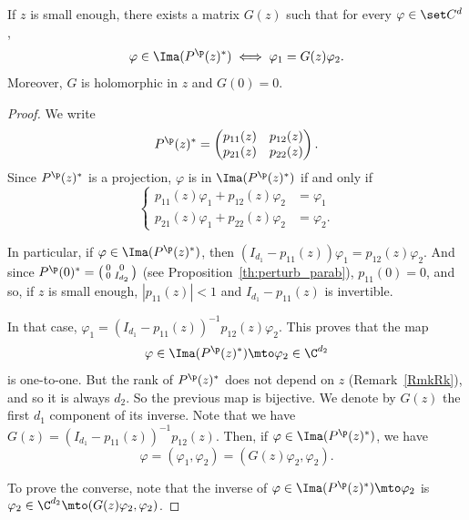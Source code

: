 \begin{prop}
\label{Prop:DefG}
If $z$ is small enough, there exists a matrix $G(z)$ such that for every $\varphi\in\set C^d$,
\[
\varphi\in\Ima(P^\p(z)^\ast) \iff \varphi_1 = G(z)\varphi_2.
\]
Moreover, $G$ is holomorphic in $z$ and $G(0) = 0$.
\end{prop}
\begin{proof}
We write
\[
P^\p(z)^\ast = \begin{pmatrix} p_{11}(z)&p_{12}(z)\\p_{21}(z)&p_{22}(z)\end{pmatrix}.
\]
Since $P^\p(z)^\ast$ is a projection, $\varphi$ is in $\Ima (P^\p(z)^\ast)$ if and only if
\begin{equation*}
\left\{\begin{aligned}p_{11}(z)\varphi_1 + p_{12}(z)\varphi_2 &= \varphi_1\\
p_{21}(z)\varphi_1 + p_{22}(z)\varphi_2 &= \varphi_2. \end{aligned}\right.
\end{equation*}

In particular, if $\varphi\in\Ima(P^\p(z)^\ast)$, then $(I_{d_1}-p_{11}(z))\varphi_1 = p_{12}(z) \varphi_2$. And since $P^\p(0)^\ast = \big(\begin{smallmatrix}0&0\\0&I_{d_2}\end{smallmatrix} \big)$ (see Proposition~\ref{th:perturb_parab}), $p_{11}(0) = 0$, and so, if $z$ is small enough, $|p_{11}(z)|<1$ and $I_{d_1} - p_{11}(z)$ is invertible.

In that case, $\varphi_1 = (I_{d_1} - p_{11}(z))^{-1} p_{12}(z) \varphi_2$. This proves that the map
\[
\varphi \in \Ima(P^\p(z)^\ast) \mto \varphi_2 \in \C^{d_2}
\]
is one-to-one. But the rank of $P^\p(z)^\ast$ does not depend on $z$ (Remark~\ref{RmkRk}), and so it is always $d_2$. So the previous map is bijective. We denote by $G(z)$ the first $d_1$ component of its inverse. Note that we have $G(z) = (I_{d_1} - p_{11}(z))^{-1} p_{12}(z)$. Then, if $\varphi\in\Ima(P^\p(z)^\ast)$, we have
\[
\varphi = (\varphi_1,\varphi_2) = (G(z)\varphi_2,\varphi_2).
\]

To prove the converse, note that the inverse of $\varphi\in\Ima(P^\p(z)^\ast)\mto \varphi_2$ is $\varphi_2\in\C^{d_2}\mto (G(z)\varphi_2,\varphi_2)$.
\end{proof}

